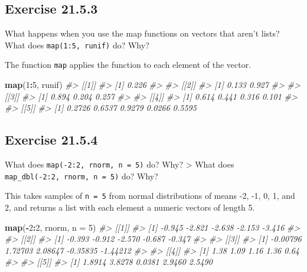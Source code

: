 \documentclass[]{book}
\newenvironment{Shaded}{\begin{snugshade}}{\end{snugshade}}
\newcommand{\CommentTok}[1]{\textcolor[rgb]{0.56,0.35,0.01}{\textit{#1}}}
\newcommand{\DataTypeTok}[1]{\textcolor[rgb]{0.13,0.29,0.53}{#1}}
\newcommand{\DecValTok}[1]{\textcolor[rgb]{0.00,0.00,0.81}{#1}}
\newcommand{\KeywordTok}[1]{\textcolor[rgb]{0.13,0.29,0.53}{\textbf{#1}}}
\newcommand{\NormalTok}[1]{#1}
\newcommand{\OperatorTok}[1]{\textcolor[rgb]{0.81,0.36,0.00}{\textbf{#1}}}
\theoremstyle{plain}
\theoremstyle{remark}
\theoremstyle{definition}
\theoremstyle{definition}
\theoremstyle{definition}
\theoremstyle{remark}
\begin{document}
\hypertarget{exercise-21.5.3}{%
\subsection*{\texorpdfstring{Exercise
{21.5.3}}{Exercise 21.5.3}}\label{exercise-21.5.3}}

What happens when you use the map functions on vectors that aren't
lists? What does \texttt{map(1:5,\ runif)} do? Why?

The function \texttt{map} applies the function to each element of the
vector.

\begin{Shaded}
\begin{Highlighting}[]
\KeywordTok{map}\NormalTok{(}\DecValTok{1}\OperatorTok{:}\DecValTok{5}\NormalTok{, runif)}
\CommentTok{#> [[1]]}
\CommentTok{#> [1] 0.226}
\CommentTok{#> }
\CommentTok{#> [[2]]}
\CommentTok{#> [1] 0.133 0.927}
\CommentTok{#> }
\CommentTok{#> [[3]]}
\CommentTok{#> [1] 0.894 0.204 0.257}
\CommentTok{#> }
\CommentTok{#> [[4]]}
\CommentTok{#> [1] 0.614 0.441 0.316 0.101}
\CommentTok{#> }
\CommentTok{#> [[5]]}
\CommentTok{#> [1] 0.2726 0.6537 0.9279 0.0266 0.5595}
\end{Highlighting}
\end{Shaded}

\hypertarget{exercise-21.5.4}{%
\subsection*{\texorpdfstring{Exercise
{21.5.4}}{Exercise 21.5.4}}\label{exercise-21.5.4}}

What does \texttt{map(-2:2,\ rnorm,\ n\ =\ 5)} do? Why? \textgreater{}
What does \texttt{map\_dbl(-2:2,\ rnorm,\ n\ =\ 5)} do? Why?

This takes samples of \texttt{n\ =\ 5} from normal distributions of
means -2, -1, 0, 1, and 2, and returns a list with each element a
numeric vectors of length 5.

\begin{Shaded}
\begin{Highlighting}[]
\KeywordTok{map}\NormalTok{(}\OperatorTok{-}\DecValTok{2}\OperatorTok{:}\DecValTok{2}\NormalTok{, rnorm, }\DataTypeTok{n =} \DecValTok{5}\NormalTok{)}
\CommentTok{#> [[1]]}
\CommentTok{#> [1] -0.945 -2.821 -2.638 -2.153 -3.416}
\CommentTok{#> }
\CommentTok{#> [[2]]}
\CommentTok{#> [1] -0.393 -0.912 -2.570 -0.687 -0.347}
\CommentTok{#> }
\CommentTok{#> [[3]]}
\CommentTok{#> [1] -0.00796  1.72703  2.08647 -0.35835 -1.44212}
\CommentTok{#> }
\CommentTok{#> [[4]]}
\CommentTok{#> [1] 1.38 1.09 1.16 1.36 0.64}
\CommentTok{#> }
\CommentTok{#> [[5]]}
\CommentTok{#> [1] 1.8914 3.8278 0.0381 2.9460 2.5490}
\end{Highlighting}
\end{Shaded}
\end{document}
